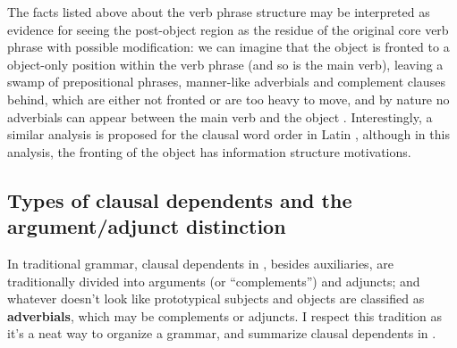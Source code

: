 \documentclass[UTF8, a4paper, oneside, scheme=plain, 12pt]{ctexbook}
\newcommand*{\citepage}[1]{p.~{#1}}
\newcommand*{\citepages}[1]{pp.~{#1}}
\newcommand*{\concept}[1]{\textbf{#1}}
\begin{document}
The facts listed above about the verb phrase structure  
may be interpreted as evidence for seeing the post-object region 
as the residue of the original core verb phrase with possible modification: 
we can imagine that the object is fronted to a object-only position within the verb phrase 
(and so is the main verb), 
leaving a swamp of prepositional phrases, manner-like adverbials and complement clauses behind, 
which are either not fronted or are too heavy to move,
and by nature no adverbials can appear between the main verb and the object
\citep[\citepages{26-28}]{koizumi1995phrase}.
Interestingly, a similar analysis is proposed for the clausal word order in Latin 
\citep[\citepage{88}]{devine2006latin}, 
although in this analysis, the fronting of the object has information structure motivations.

\subsection{Types of clausal dependents and the argument/adjunct distinction}

In traditional grammar,
clausal dependents in ,
besides auxiliaries, are traditionally divided into arguments (or ``complements'') and adjuncts; 
and whatever doesn't look like prototypical subjects and objects 
are classified as \concept{adverbials}, 
which may be complements or adjuncts.
I respect this tradition as it's a neat way to organize a grammar, 
and summarize clausal dependents in .
\end{document}
